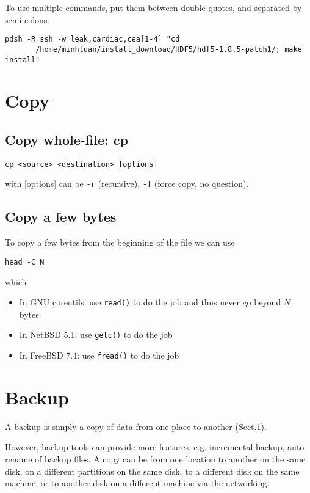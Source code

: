 To use multiple commands, put them between double quotes, and separated by
semi-colons.
{\tiny
\begin{verbatim}
pdsh -R ssh -w leak,cardiac,cea[1-4] "cd
       /home/minhtuan/install_download/HDF5/hdf5-1.8.5-patch1/; make install"
\end{verbatim}
}

\section{Copy}
\label{sec:copy}

\subsection{Copy whole-file: cp}
\label{sec:copy_cp}

\begin{verbatim}
cp <source> <destination> [options]
\end{verbatim}
with [options] can be 
\verb!-r! (recursive), \verb!-f! (force copy, no question).

\subsection{Copy a few bytes}

To copy a few bytes from the beginning of the file we can use
\begin{verbatim}
head -C N
\end{verbatim}
which 
\begin{itemize}
  \item In GNU coreutils: use  \verb!read()! to do the job and thus never go
  beyond $N$ bytes.
  \item In NetBSD 5.1: use \verb!getc()! to do the job
  \item In FreeBSD 7.4: use \verb!fread()! to do the job
\end{itemize}



\section{Backup}
\label{sec:backup}

A backup is simply a copy of data from one place to another
(Sect.\ref{sec:copy}).

However, backup tools can provide more features, e.g. incremental backup, auto
rename of backup files. A copy can be from one location to another on the same
disk, on a different partitions on the same disk, to a different disk on the
same machine, or to another disk on a different machine via the networking.

